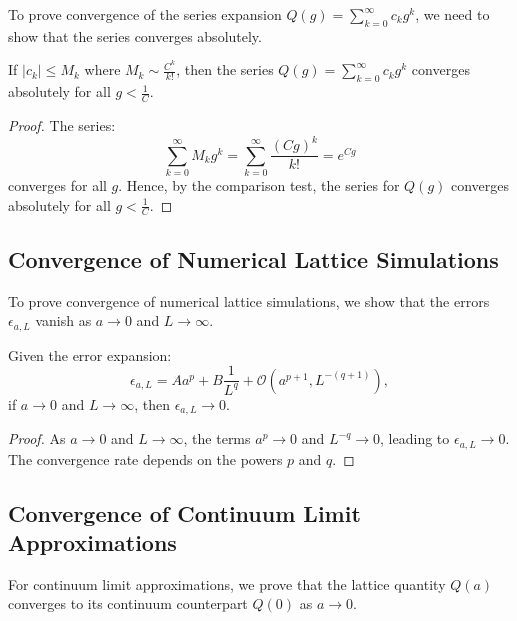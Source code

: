 To prove convergence of the series expansion \(Q(g) = \sum_{k=0}^\infty c_k g^k\), we need to show that the series converges absolutely.

\begin{theorem}
If \(|c_k| \leq M_k\) where \(M_k \sim \frac{C^k}{k!}\), then the series \(Q(g) = \sum_{k=0}^\infty c_k g^k\) converges absolutely for all \(g < \frac{1}{C}\).
\end{theorem}

\begin{proof}
The series:
\begin{equation}
\sum_{k=0}^\infty M_k g^k = \sum_{k=0}^\infty \frac{(Cg)^k}{k!} = e^{Cg}
\end{equation}
converges for all \(g\). Hence, by the comparison test, the series for \(Q(g)\) converges absolutely for all \(g < \frac{1}{C}\).
\end{proof}

\subsection{Convergence of Numerical Lattice Simulations}

To prove convergence of numerical lattice simulations, we show that the errors \(\epsilon_{a, L}\) vanish as \(a \to 0\) and \(L \to \infty\).

\begin{theorem}
Given the error expansion:
\begin{equation}
\epsilon_{a, L} = A a^p + B \frac{1}{L^q} + \mathcal{O}(a^{p+1}, L^{-(q+1)}),
\end{equation}
if \(a \to 0\) and \(L \to \infty\), then \(\epsilon_{a, L} \to 0\).
\end{theorem}

\begin{proof}
As \(a \to 0\) and \(L \to \infty\), the terms \(a^p \to 0\) and \(L^{-q} \to 0\), leading to \(\epsilon_{a, L} \to 0\). The convergence rate depends on the powers \(p\) and \(q\).
\end{proof}

\subsection{Convergence of Continuum Limit Approximations}

For continuum limit approximations, we prove that the lattice quantity \(Q(a)\) converges to its continuum counterpart \(Q(0)\) as \(a \to 0\).

